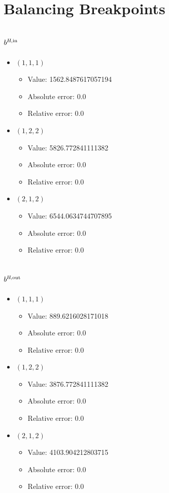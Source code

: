 \documentclass{article}%
\begin{document}
\section{Balancing Breakpoints}%
\subsection{$b^{\textsl{H},\text{in}}$}%
\begin{itemize}%
	\item $(1, 1, 1)$%
	\begin{itemize}%
		\item Value: 1562.8487617057194%
		\item Absolute error: 0.0%
		\item Relative error: 0.0%
	\end{itemize}%
	\item $(1, 2, 2)$%
	\begin{itemize}%
		\item Value: 5826.772841111382%
		\item Absolute error: 0.0%
		\item Relative error: 0.0%
	\end{itemize}%
	\item $(2, 1, 2)$%
	\begin{itemize}%
		\item Value: 6544.0634744707895%
		\item Absolute error: 0.0%
		\item Relative error: 0.0%
	\end{itemize}%
\end{itemize}%
\subsection{$b^{\textsl{H},\text{out}}$}%
\begin{itemize}%
	\item $(1, 1, 1)$%
	\begin{itemize}%
		\item Value: 889.6216028171018%
		\item Absolute error: 0.0%
		\item Relative error: 0.0%
	\end{itemize}%
	\item $(1, 2, 2)$%
	\begin{itemize}%
		\item Value: 3876.772841111382%
		\item Absolute error: 0.0%
		\item Relative error: 0.0%
	\end{itemize}%
	\item $(2, 1, 2)$%
	\begin{itemize}%
		\item Value: 4103.904212803715%
		\item Absolute error: 0.0%
		\item Relative error: 0.0%
	\end{itemize}%
\end{itemize}%
\end{document}
